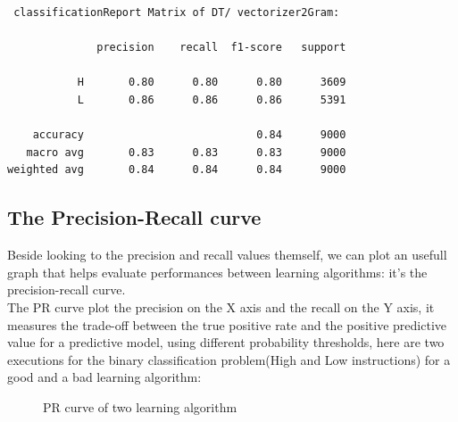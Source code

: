 \documentclass{article}
\begin{document}
 \begin{verbatim}
 classificationReport Matrix of DT/ vectorizer2Gram:

              precision    recall  f1-score   support

           H       0.80      0.80      0.80      3609
           L       0.86      0.86      0.86      5391

    accuracy                           0.84      9000
   macro avg       0.83      0.83      0.83      9000
weighted avg       0.84      0.84      0.84      9000
 \end{verbatim}

\subsection{The Precision-Recall curve}
Beside looking to the precision and recall values themself, we can plot an usefull graph that helps evaluate performances between learning algorithms: it's the precision-recall curve.\\
The PR curve plot the precision on the X axis and the recall on the Y axis, it measures the trade-off between the true positive rate and the positive predictive value for a predictive model, using different probability thresholds, here are two executions for the binary classification problem(High and Low instructions) for a good and a bad learning algorithm:

\begin{figure}[h]
\centering
{}%
\hfill %
%
\caption{PR curve of two learning algorithm}
\end{figure}
\end{document}
